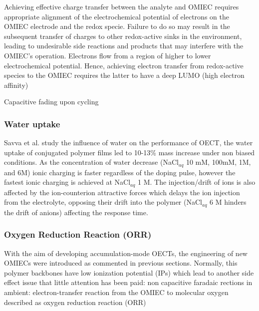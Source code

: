 Achieving effective charge transfer between the analyte and OMIEC requires appropriate alignment of the electrochemical potential of electrons on the OMIEC electrode and the redox specie. Failure to do so may result in the subsequent transfer of charges to other redox-active sinks in the environment, leading to undesirable side reactions and products that may interfere with the OMIEC’s operation. Electrons flow from a region of higher to lower electrochemical potential. Hence, achieving electron transfer from redox-active species to the OMIEC requires the latter to have a deep LUMO (high electron affinity) \cite{tanMixedIonicElectronic2022} %

Capacitive fading upon cycling

\subsubsection{Water uptake}

Savva et al. study the influence of water on the performance of OECT, the water uptake of conjugated polymer films led to 10-13\% mass increase under non biased conditions. As the concentration of water decrease (NaCl$_{aq}$ 10 mM, 100mM, 1M, and 6M) ionic charging is faster regardless of the doping pulse, however the fastest ionic charging is achieved at NaCl$_{aq}$ 1 M. The injection/drift of ions is also affected by the ion-counterion attractive forces which delays the ion injection from the electrolyte, opposing their drift into the polymer (NaCl$_{aq}$ 6 M hinders the drift of anions) affecting the response time. \cite{savvaInfluenceWaterPerformance2019}

\subsubsection{Oxygen Reduction Reaction (ORR)}

With the aim of developing accumulation-mode OECTs, the engineering of new OMIECs were introduced as commented in previous sections. Normally, this polymer backbones have low ionization potential (IPs) which lead to another side effect issue that little attention has been paid: non capacitive faradaic rections in ambient: electron-transfer reaction from the OMIEC to molecular oxygen described as oxygen reduction reaction (ORR)


